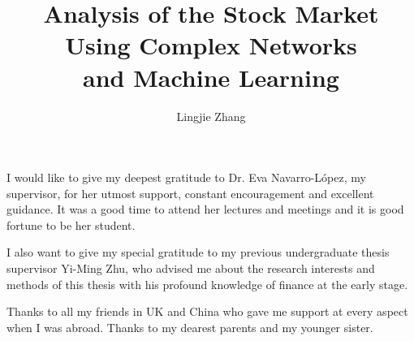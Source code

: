 \documentclass[12pt,MSc,wordcount,twoside]{muthesis}
\begin{document}

\title{Analysis of the Stock Market\\
  Using Complex Networks\\
  and Machine Learning}
\author{Lingjie Zhang}

\beforeabstract



\afterabstract

I would like to give my deepest gratitude to Dr. Eva Navarro-López, my supervisor, for her utmost support, constant encouragement and excellent guidance. It was a good time to attend her lectures and meetings and it is good fortune to be her student.

I also want to give my special gratitude to my previous undergraduate thesis supervisor Yi-Ming Zhu, who advised me about the research interests and methods of this thesis with his profound knowledge of finance at the early stage.

Thanks to all my friends in UK and China who gave me support at every aspect when I was abroad. Thanks to my dearest parents and my younger sister.

\afterpreface

\tableofcontents











% 





\appendix

\end{document}
